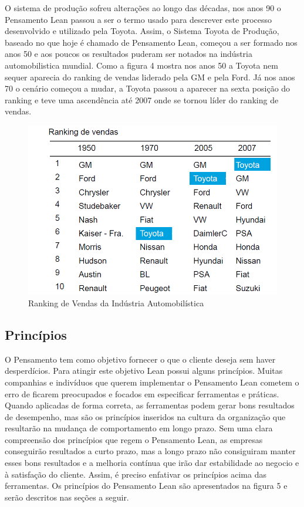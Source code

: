 O sistema de produção sofreu alterações ao longo das décadas, nos anos 90 o Pensamento Lean passou a ser o termo usado para descrever este processo desenvolvido e utilizado pela Toyota. Assim, o Sistema Toyota de Produção, baseado no que hoje é chamado de Pensamento Lean, começou a ser formado nos anos 50 e aos poucos os resultados puderam ser notados na indústria automobilistica mundial. Como a figura 4 mostra nos anos 50 a Toyota nem sequer aparecia do ranking de vendas liderado pela GM e pela Ford. Já nos anos 70 o cenário começou a mudar, a Toyota passou a aparecer na sexta posição do ranking e teve uma ascendência até 2007 onde se tornou líder do ranking de vendas.

\begin{figure}[h]
		\centering
		\label{fig01}
			\includegraphics[scale=0.5]{figuras/ranking.png}
		\caption{Ranking de Vendas da Indústria Automobilística  \cite{ranking}}
\end{figure}

\subsection[Princípios]{Princípios}

O Pensamento tem como objetivo fornecer o que o cliente deseja sem haver desperdícios. Para atingir este objetivo Lean possui alguns princípios. Muitas companhias e indivíduos que querem implementar o Pensamento Lean cometem o erro de ficarem preocupados e focados em especificar ferramentas e práticas. Quando aplicadas de forma correta, as ferramentas podem gerar bons resultados de desempenho, mas são os princípios inseridos na cultura da organização que resultarão na mudança de comportamento em longo prazo. Sem uma clara compreensão dos princípios que regem o Pensamento Lean, as empresas conseguirão resultados a curto prazo, mas a longo prazo não consiguiram manter esses bons resultados e a melhoria contínua que irão dar estabilidade ao negocio e à satisfação do cliente. Assim, é preciso enfativar os princípios acima das ferramentas. Os princípios do Pensamento Lean são apresentados na figura 5 e serão descritos nas seções a seguir.

